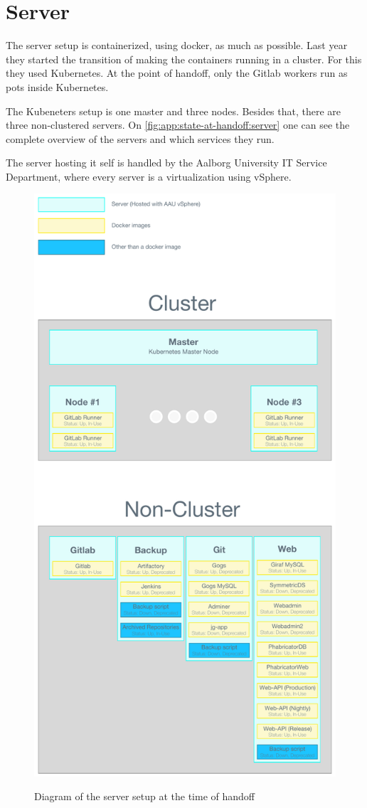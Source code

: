 \section{Server}\label{app:state-at-handoff:server}

The server setup is containerized, using docker, as much as possible. Last year they started the transition of making the containers running in a cluster. For this they used Kubernetes. At the point of handoff, only the Gitlab workers run as pots inside Kubernetes.

The Kubeneters setup is one master and three nodes. Besides that, there are three non-clustered servers. On \autoref{fig:app:state-at-handoff:server} one can see the complete overview of the servers and which services they run.

The server hosting it self is handled by the Aalborg University IT Service Department, where every server is a virtualization using vSphere.

\begin{figure}[h]
    \centering
    \caption{Diagram of the server setup at the time of handoff}
    \includegraphics[height=1\textheight]{figures/Server-Overview.pdf}
    \label{fig:app:state-at-handoff:server}
\end{figure}